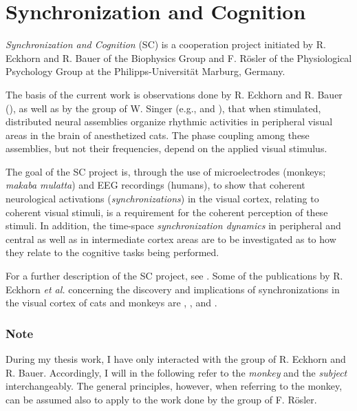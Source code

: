 
\section{Synchronization and Cognition}
\label{intro:synch}

{\em Synchronization and Cognition} (SC) is a cooperation project
initiated by R. Eckhorn and R. Bauer of the Biophysics Group and
F. R{\"o}sler of the Physiological Psychology Group at the
Philipps-Universit{\"a}t Marburg, Germany.

The basis of the current work is observations done by R. Eckhorn and
R. Bauer (\cite{cat}), as well as by the group of W. Singer (e.g.,
\cite{singer2} and \cite{singer1}), that when stimulated, distributed
neural assemblies organize rhythmic activities in peripheral visual
areas in the brain of anesthetized cats.  The phase coupling among
these assemblies, but not their frequencies, depend on the applied
visual stimulus.

The goal of the SC project is, through the use of microelectrodes
(monkeys; {\em makaba mulatta}) and EEG recordings (humans), to show
that coherent neurological activations ({\em synchronizations}) in the
visual cortex, relating to coherent visual stimuli, is a requirement
for the coherent perception of these stimuli.  In addition, the
time-space {\em synchronization dynamics} in peripheral and central as
well as in intermediate cortex areas are to be investigated as to how
they relate to the cognitive tasks being performed.

For a further description of the SC project, see \cite{antrag}.  Some
of the publications by R. Eckhorn {\em et al.} concerning the
discovery and implications of synchronizations in the visual cortex of
cats and monkeys are \cite{eckhorn1}, \cite{eckhorn2}, \cite{cat} and
\cite{eckhorn3}.

\subsubsection{Note}

During my thesis work, I have only interacted with the group of
R. Eckhorn and R. Bauer.  Accordingly, I will in the following refer
to the {\em monkey} and the {\em subject} interchangeably.  The
general principles, however, when referring to the monkey, can be
assumed also to apply to the work done by the group of F. R{\"o}sler.
